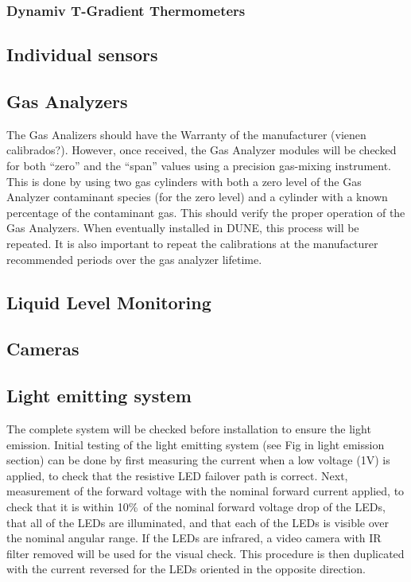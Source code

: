 \subsubsection{Dynamiv T-Gradient Thermometers}
\label{sec:fdsp-slow-cryo-qc-thdy}

\subsection{Individual sensors}
\label{sec:fdsp-slow-cryo-qc-is}

\subsection{Gas Analyzers}
\label{sec:fdsp-slow-cryo-qc-ga}

The Gas Analizers should have the Warranty of the manufacturer (vienen calibrados?). However, once received, the Gas Analyzer modules will be checked for both “zero” and the “span” values using a precision gas-mixing instrument. This is done by using two gas cylinders with both a zero level of the Gas Analyzer contaminant species (for the zero level) and a cylinder with a known percentage of the contaminant gas. This should verify the proper operation of the Gas Analyzers. When eventually installed in DUNE, this process will be repeated. It is also important to repeat the calibrations at the manufacturer recommended periods over the gas analyzer lifetime.

 

\subsection{Liquid Level Monitoring}
\label{sec:fdsp-slow-cryo-qc-llm}

\subsection{Cameras}
\label{sec:fdsp-slow-cryo-qc-c}

\subsection{Light emitting system}
\label{sec:fdsp-slow-cryo-qc-les}

The complete system will be checked before installation to ensure the light emission. 
Initial testing of the light emitting system (see Fig in light
emission section) can be done by first
measuring the current when a low voltage (1V) is applied, to check
that the resistive LED failover path is correct. Next, measurement
of the forward voltage with the nominal forward current applied, to
check that it is within 10\%\ of the nominal forward voltage drop of
the LEDs, that all of the LEDs are illuminated, and that each of the
LEDs is visible over the nominal angular range. If the LEDs are
infrared, a video camera with IR filter removed will be used for the
visual check. This procedure is then duplicated with the current
reversed for the LEDs oriented in the opposite direction.  

